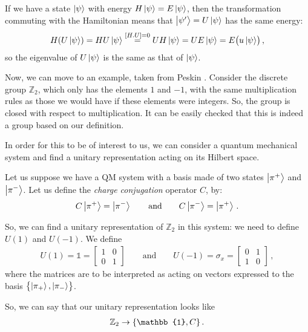 \documentclass[main.tex]{subfiles}
\begin{document}
If we have a state \(\ket{\psi }\) with energy \(H \ket{\psi } = E \ket{\psi }\), then the transformation commuting with the Hamiltonian means that \(\ket{\psi'} = U \ket{\psi }\) has the same energy: 
%
\begin{align}
H (U \ket{\psi }) = HU \ket{\psi } \overset{[H. U] = 0}{=} UH \ket{\psi } =
 U E \ket{\psi } = E \qty(u \ket{\psi })
\,,
\end{align}
%
so the eigenvalue of \(U \ket{\psi }\) is the same as that of \(\ket{\psi }\).

Now, we can move to an example, taken from Peskin \cite[eq.\ 2.38 onward]{peskinConceptsElementaryParticle2019}. 
Consider the discrete group \(\mathbb{Z}_{2}\), which only has the elements \(1\) and \(-1\), with the same multiplication rules as those we would have if these elements were integers. 
So, the group is closed with respect to multiplication.
It can be easily checked that this is indeed a group based on our definition. 

In order for this to be of interest to us, we can consider a quantum mechanical system and find a unitary representation acting on its Hilbert space. 

Let us suppose we have a QM system with a basis made of two states \(\ket{\pi^{+}}\) and \(\ket{\pi^{-}}\). Let us define the \emph{charge conjugation} operator \(C\), by: 
%
\begin{align}
C \ket{\pi^{+}} = \ket{\pi^{-}} 
\qquad \text{and} \qquad
C \ket{\pi^{-}} = \ket{\pi^{+}} 
\,.
\end{align}

So, we can find a unitary representation of \(\mathbb{Z}_{2}\) in this system: we need to define \(U(1)\) and \(U(-1)\). We define 
%
\begin{subequations}
\begin{align}
U(1) = \mathbb{1} =\left[\begin{array}{cc}
1 & 0 \\ 
0 & 1
\end{array}\right] 
\qquad \text{and} \qquad
U(-1) = \sigma_{x} = \left[\begin{array}{cc}
0 & 1 \\ 
1 & 0
\end{array}\right]
\,,
\end{align}
\end{subequations}
%
where the matrices are to be interpreted as acting on vectors expressed to the basis \(\qty{\ket{\pi_{+}}, \ket{\pi_{-}}}\).

So, we can say that our unitary representation looks like 
%
\begin{align}
\mathbb{Z}_{2} \rightarrow \qty{\mathbb{1}, C}
\,.
\end{align}
\end{document}
